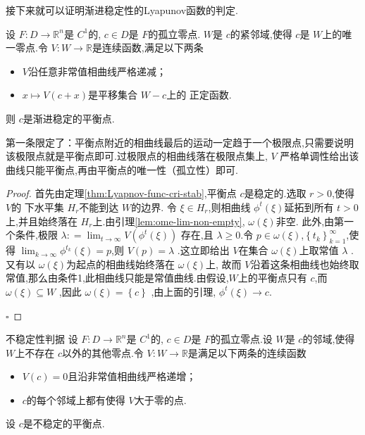 \documentclass[lang=cn,12pt,color=green,fontset=none]{elegantbook}
\begin{document}
接下来就可以证明渐进稳定性的Lyapunov函数的判定.
\begin{corollary}\label{cor:lyapunov-func-asym-stab-cri}
    设 $ F:D\to \mathbb{R} ^{n} $是 $ C^{1} $的, $ c \in D $是 $ F $的孤立零点. $ W $是 $ c $的紧邻域,使得 $ c $是 $ W $上的唯一零点.令 $ V:W\to \mathbb{R}  $是连续函数,满足以下两条
    \begin{itemize}
        \item  $ V $沿任意非常值相曲线严格递减；
        \item  $ x\mapsto V\left( c+ x \right)  $是平移集合 $ W-c $上的   正定函数.
    \end{itemize}
              则 $ c $是渐进稳定的平衡点. 
\end{corollary}

\begin{note}
    第一条限定了：平衡点附近的相曲线最后的运动一定趋于一个极限点,只需要说明该极限点就是平衡点即可.过极限点的相曲线落在极限点集上, $ V $ 严格单调性给出该曲线只能平衡点,再由平衡点的唯一性（孤立性）即可.
\end{note}
\begin{proof}
    首先由定理\ref{thm:Lyapnov-func-cri-stab},平衡点 $ c $是稳定的.选取 $ r>0 $,使得 $ V $的 下水平集  $ H_{r} $不能到达 $ W $的边界.
    令 $  \xi  \in H_{r} $,则相曲线 $ \phi ^{t}\left(  \xi  \right)  $延拓到所有 $ t>0 $上,并且始终落在 $ H_{r}  $上.由引理\ref{lem:ome-lim-non-empty}, $  \omega \left(  \xi  \right)  $非空.
    此外,由第一个条件,极限 $  \lambda : = \lim_{t \to \infty}V\left( \phi ^{t}\left(  \xi  \right)  \right)  $  存在,且 $  \lambda \ge 0 $.令 $ p \in  \omega \left(  \xi  \right)  $,$ \left\{ t_{k} \right\} _{k=1}^{\infty}$,使得 $ \lim_{k \to \infty} \phi ^{t_{k}}\left(  \xi  \right) =p$,则 $ V\left( p \right)=\lambda   $  .这立即给出 $ V $在集合 $  \omega \left(  \xi  \right)  $上取常值 $ \lambda  $ .
    又有以 $  \omega \left(  \xi  \right)  $为起点的相曲线始终落在 $  \omega \left(  \xi  \right)  $上,  故而 $ V $沿着这条相曲线也始终取常值,那么由条件1,此相曲线只能是常值曲线.由假设,$ W $上的平衡点只有 $ c $,而 $  \omega \left(  \xi  \right)\subseteq W  $    ,因此 $  \omega \left(  \xi  \right)=\left\{ c \right\}  $ ,由上面的引理, $ \phi ^{t}\left(  \xi  \right)\to c  $. 

    \hfill $\square$
\end{proof}

\begin{theorem}{不稳定性判据}
    设 $ F:D\to \mathbb{R} ^{n} $是 $ C^{1} $的, $ c \in D $是 $ F $的孤立零点.设 $ W $是 $ c $的邻域,使得 $ W $上不存在 $ c $以外的其他零点.令 $ V:W\to \mathbb{R}  $是满足以下两条的连续函数
    \begin{itemize}
        \item $ V\left( c \right)=0  $且沿非常值相曲线严格递增；
        \item $ c $的每个邻域上都有使得 $ V $大于零的点.   
    \end{itemize}
    设 $ c $是不稳定的平衡点. 
\end{theorem}
\end{document}

